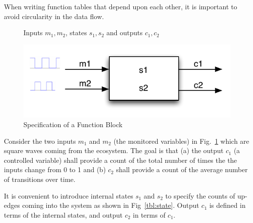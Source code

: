 When writing function tables that depend upon each other, it is important to avoid circularity in the data flow.

\begin{figure}[htbp]
\begin{mdframed}
\begin{center}

Inputs $m_1,m_2$, states $s_1, s_2$ and outputs $c_1,c_2$

\includegraphics[width=.8\textwidth]{pics/dataflow.pdf} 
\end{center}
\end{mdframed}

\caption{Specification of a Function Block}
\label{fig:fb}
\end{figure}

Consider the two inputs $m_1$ and $m_2$ (the monitored variables) in Fig.~\ref{fig:fb} which are square waves coming from the ecosystem. The goal is that (a) the output $c_1$ (a controlled variable) shall provide a count of the total number of times the the inputs change from 0 to 1 and (b) $c_2$ shall provide a count of the average number of transitions over time.   

It is convenient to introduce internal states $s_1$ and $s_2$ to specify the counts of up-edges coming into the system as shown in Fig~\ref{tbl:state}. Output $c_1$ is defined in terms of the internal states, and output $c_2$ in terms of $c_1$.

